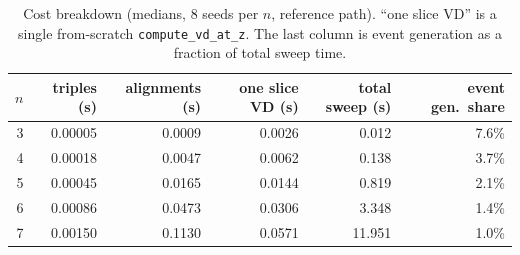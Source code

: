 \begin{table}[htbp]
\centering
\begin{tabular}{rrrrrr}
\toprule
$n$ & triples (s) & alignments (s) & one slice VD (s) & total sweep (s) & event gen.\ share \\
\midrule
3 & 0.00005 & 0.0009 & 0.0026 & 0.012 & 7.6\% \\
4 & 0.00018 & 0.0047 & 0.0062 & 0.138 & 3.7\% \\
5 & 0.00045 & 0.0165 & 0.0144 & 0.819 & 2.1\% \\
6 & 0.00086 & 0.0473 & 0.0306 & 3.348 & 1.4\% \\
7 & 0.00150 & 0.1130 & 0.0571 & 11.951 & 1.0\% \\
\bottomrule
\end{tabular}
\caption{Cost breakdown (medians, 8 seeds per $n$, reference path). ``one slice VD'' is a single from-scratch \texttt{compute\_vd\_at\_z}. The last column is event generation as a fraction of total sweep time.}
\label{tab:breakdown}
\end{table}
